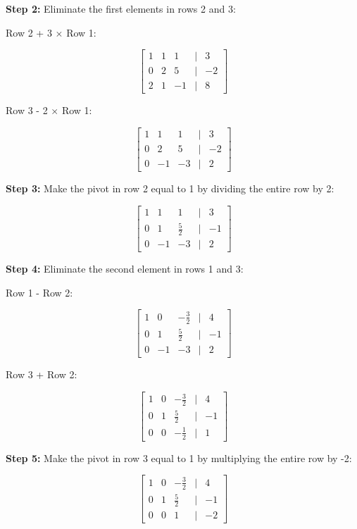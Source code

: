 \textbf{Step 2:} Eliminate the first elements in rows 2 and 3:

Row 2 + 3 \(\times\) Row 1:

\[
    \begin{bmatrix}
    1 & 1 & 1 & | & 3 \\
    0 & 2 & 5 & | & -2 \\
    2 & 1 & -1 & | & 8
    \end{bmatrix}
\]

Row 3 - 2 \(\times\) Row 1:

\[
    \begin{bmatrix}
    1 & 1 & 1 & | & 3 \\
    0 & 2 & 5 & | & -2 \\
    0 & -1 & -3 & | & 2
    \end{bmatrix}
\]

\textbf{Step 3:} Make the pivot in row 2 equal to 1 by dividing the entire row by 2:

\[
    \begin{bmatrix}
    1 & 1 & 1 & | & 3 \\
    0 & 1 & \frac{5}{2} & | & -1 \\
    0 & -1 & -3 & | & 2
    \end{bmatrix}
\]

\textbf{Step 4:} Eliminate the second element in rows 1 and 3:

Row 1 - Row 2:

\[
    \begin{bmatrix}
    1 & 0 & -\frac{3}{2} & | & 4 \\
    0 & 1 & \frac{5}{2} & | & -1 \\
    0 & -1 & -3 & | & 2
    \end{bmatrix}
\]

Row 3 + Row 2:

\[
    \begin{bmatrix}
    1 & 0 & -\frac{3}{2} & | & 4 \\
    0 & 1 & \frac{5}{2} & | & -1 \\
    0 & 0 & -\frac{1}{2} & | & 1
    \end{bmatrix}
\]

\textbf{Step 5:} Make the pivot in row 3 equal to 1 by multiplying the entire row by -2:

\[
    \begin{bmatrix}
    1 & 0 & -\frac{3}{2} & | & 4 \\
    0 & 1 & \frac{5}{2} & | & -1 \\
    0 & 0 & 1 & | & -2
    \end{bmatrix}
\]

